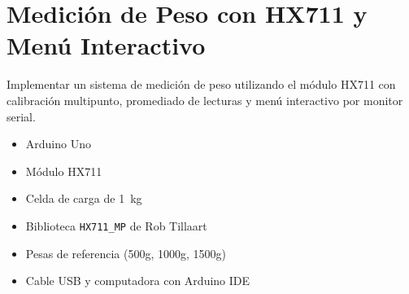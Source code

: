\chapter{Medición de Peso con HX711 y Menú Interactivo}
\obj
Implementar un sistema de medición de peso utilizando el módulo HX711 con calibración multipunto, promediado de lecturas y menú interactivo por monitor serial.

\mat
\begin{itemize}
  \item Arduino Uno
  \item Módulo HX711
  \item Celda de carga de \SI{1}{\kilogram}
  \item Biblioteca \texttt{HX711\_MP} de Rob Tillaart
  \item Pesas de referencia (500g, 1000g, 1500g)
  \item Cable USB y computadora con Arduino IDE
\end{itemize}

